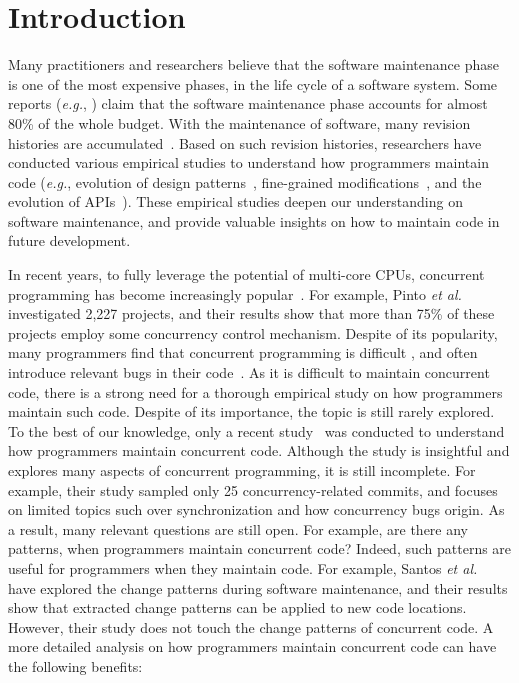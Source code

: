 \section{Introduction}
\label{sec:intro}
Many practitioners and researchers believe that the software maintenance phase is one of the most expensive phases, in the life cycle of a software system. Some reports (\emph{e.g.}, \cite{ahn2003software}) claim that the software maintenance phase accounts for almost 80\% of the whole budget. With the maintenance of software, many revision histories are accumulated~\cite{conf/icsm/Borges16}. Based on such revision histories, researchers have conducted various empirical studies to understand how programmers maintain code (\emph{e.g.}, evolution of design patterns~\cite{aversano2007empirical}, fine-grained modifications~\cite{german2006empirical}, and the evolution of APIs~\cite{mcdonnell2013empirical}). These empirical studies deepen our understanding on software maintenance, and provide valuable insights on how to maintain code in future development.

In recent years, to fully leverage the potential of multi-core CPUs, concurrent programming has become increasingly popular~\cite{journals/jss/PintoTFFB15}. For example, Pinto \emph{et al.}~\cite{journals/jss/PintoTFFB15} investigated 2,227 projects, and their results show that more than 75\% of these projects employ some concurrency control mechanism. Despite of its popularity, many programmers find that concurrent programming is difficult \cite{journals/corr/McKenney17}, and often introduce relevant bugs in their code~\cite{conf/asplos/LuPSZ08}. As it is difficult to maintain concurrent code, there is a strong need for a thorough empirical study on how programmers maintain such code. Despite of its importance, the topic is still rarely explored. To the best of our knowledge, only a recent study~\cite{conf/sigsoft/GuJSZL15} was conducted to understand how programmers maintain concurrent code. Although the study is insightful and explores many aspects of concurrent programming, it is still incomplete. For example, their study sampled only 25 concurrency-related commits, and focuses on limited topics such over synchronization and how concurrency bugs origin. As a result, many relevant questions are still open. For example, are there any patterns, when programmers maintain concurrent code? Indeed, such patterns are useful for programmers when they maintain code. For example, Santos \emph{et al.}~\cite{conf/icsm/SantosAEDV15} have explored the change patterns during software maintenance, and their results show that extracted change patterns can be applied to new code locations. However, their study does not touch the change patterns of concurrent code. A more detailed analysis on how programmers maintain concurrent code can have the following benefits:



